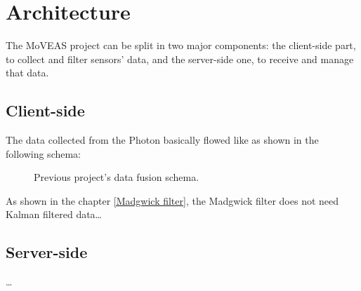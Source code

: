 \chapter{Architecture}
The MoVEAS project can be split in two major components: the client-side part, to collect and filter sensors' data, and the server-side one, to receive and manage that data.

\section{Client-side}
The data collected from the Photon basically flowed like as shown in the following schema:

\begin{center}
	\begin{figure}[ht]
		\caption{Previous project's data fusion schema.} \label{old data fusion schema}
	\end{figure}
\end{center}
\bigbreak

As shown in the chapter \ref{Madgwick filter}, the Madgwick filter does not need Kalman filtered data\dots

\section{Server-side}
\dots
